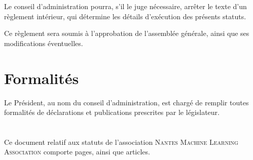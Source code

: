 \documentclass[12 pt]{article}
\newcommand{\Nom}{\textsc{Nantes Machine Learning Association}}
\begin{document}
Le conseil d'administration pourra, s'il le juge nécessaire, arrêter
le texte d'un règlement intérieur, qui détermine les détails
d'exécution des présents statuts.

Ce règlement sera soumis à l'approbation de l'assemblée générale,
ainsi que ses modifications éventuelles.

\section{Formalités}
\label{sec:formalites}

Le Président, au nom du conseil d'administration, est chargé de remplir toutes formalités de déclarations et publications prescrites par le législateur.

\section*{}

Ce document relatif aux statuts de l'association \Nom{} comporte
\pageref{LastPage} pages, ainsi que  articles.

\end{document}
